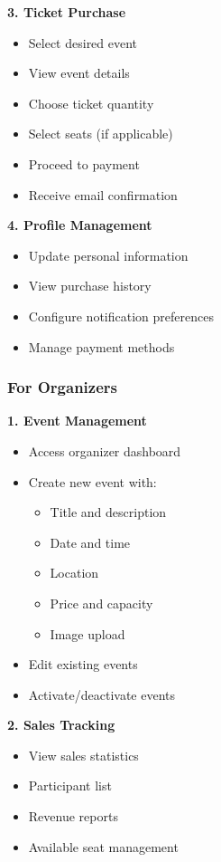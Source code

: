 \documentclass[12pt,a4paper]{article}
\begin{document}
\textbf{3. Ticket Purchase}
\begin{itemize}
    \item Select desired event
    \item View event details
    \item Choose ticket quantity
    \item Select seats (if applicable)
    \item Proceed to payment
    \item Receive email confirmation
\end{itemize}

\textbf{4. Profile Management}
\begin{itemize}
    \item Update personal information
    \item View purchase history
    \item Configure notification preferences
    \item Manage payment methods
\end{itemize}

\subsubsection{For Organizers}

\textbf{1. Event Management}
\begin{itemize}
    \item Access organizer dashboard
    \item Create new event with:
    \begin{itemize}
        \item Title and description
        \item Date and time
        \item Location
        \item Price and capacity
        \item Image upload
    \end{itemize}
    \item Edit existing events
    \item Activate/deactivate events
\end{itemize}

\textbf{2. Sales Tracking}
\begin{itemize}
    \item View sales statistics
    \item Participant list
    \item Revenue reports
    \item Available seat management
\end{itemize}
\end{document}
